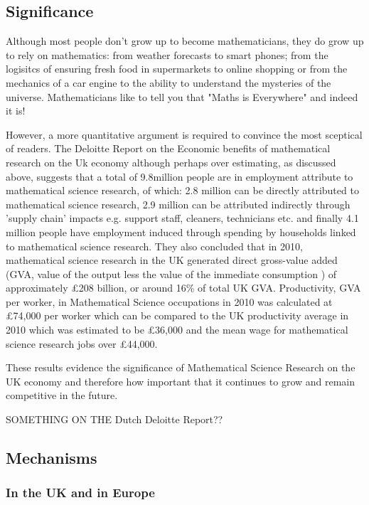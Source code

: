 \documentclass[11pt]{article} %
\begin{document}
	
	\subsection{Significance}
	
Although most people don't grow up to become mathematicians, they do grow up to rely on mathematics: from weather forecasts to smart phones; from the logisitcs of ensuring fresh food in supermarkets to online shopping or from the mechanics of a car engine to  the ability to understand the mysteries of the universe. Mathematicians like to tell you that "Maths is Everywhere" and indeed it is! 

However, a more quantitative argument is required to convince the most sceptical of readers. The Deloitte Report on the Economic benefits of mathematical research on the Uk economy \cite{deloitteuk} although perhaps over estimating, as discussed above, suggests that a total of 9.8million people are in employment attribute to mathematical science research, of which: 2.8 million can be directly attributed to mathematical science research, 2.9 million can be attributed indirectly through 'supply chain' impacts e.g. support staff, cleaners, technicians etc. and finally 4.1 million people have employment induced  through spending by households linked to mathematical science research. They also concluded that in 2010, mathematical science research in the UK generated direct gross-value added (GVA, value of the output less the value of the immediate consumption ) of approximately £208 billion, or around 16\% of total UK GVA.  Productivity, GVA per worker, in Mathematical Science occupations in 2010 was calculated at £74,000 per worker which can be compared to the UK productivity average in 2010 which was estimated to be £36,000 and the mean wage for mathematical science research jobs over £44,000. 
 
 These results evidence the significance of Mathematical Science Research on the UK economy and therefore how important that it continues to grow and remain competitive in the future. 
 
 
	
	SOMETHING ON THE Dutch Deloitte Report??
	
	 
	\subsection{Mechanisms}
	
	\subsubsection{In the UK  and in Europe }
	
\end{document}
